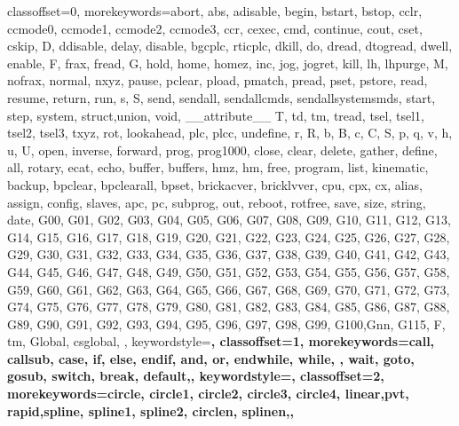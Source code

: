 {%
    classoffset=0,
    morekeywords={abort, abs, adisable, begin, bstart, bstop,%
    cclr, ccmode0, ccmode1, ccmode2, ccmode3, ccr,  cexec,%
    cmd, continue, cout, cset, cskip, D, ddisable,  delay,%
    disable, bgcplc, rticplc, dkill, do, dread, dtogread, dwell,%
    enable, F, frax, fread, G, hold, home, homez, inc, jog, jogret,%
    kill, lh, lhpurge, M, nofrax, normal, nxyz, pause, pclear, pload,%
    pmatch, pread, pset, pstore, read, resume, return, run, s, S, send,%
    sendall, sendallcmds, sendallsystemsmds, start, step, system, %
    struct,union, void, __attribute__%
    T, td, tm, tread, tsel, tsel1, tsel2, tsel3, txyz,%
    rot, lookahead, plc, plcc, undefine, r, R, b, B, c, C, S,%
    p, q, v, h, u, U, %
    open, inverse, forward, prog, prog1000, close, clear, delete, gather,%
    define, all, rotary, ecat, echo, buffer, buffers, hmz, hm, free,%
    program, list, kinematic, backup, bpclear, bpclearall, bpset, %
    brickacver, bricklvver, cpu, cpx, cx, alias, assign, config, slaves,%
    apc, pc, subprog, out, reboot, rotfree, save, size, string, date,%
    G00, G01, G02, G03, G04, G05, G06, G07, G08, G09,%
    G10, G11, G12, G13, G14, G15, G16, G17, G18, G19,%
    G20, G21, G22, G23, G24, G25, G26, G27, G28, G29,%
    G30, G31, G32, G33, G34, G35, G36, G37, G38, G39,%
    G40, G41, G42, G43, G44, G45, G46, G47, G48, G49,%
    G50, G51, G52, G53, G54, G55, G56, G57, G58, G59,%
    G60, G61, G62, G63, G64, G65, G66, G67, G68, G69,%
    G70, G71, G72, G73, G74, G75, G76, G77, G78, G79,%
    G80, G81, G82, G83, G84, G85, G86, G87, G88, G89,%
    G90, G91, G92, G93, G94, G95, G96, G97, G98, G99,%
    G100,Gnn, G115, F, tm, Global, csglobal,%
    },%
    keywordstyle=\ttfamily\normalfont\bfseries\color{key_word_1_color},%
    classoffset=1,%
    morekeywords={call, callsub, case, if, else, endif, and, or, endwhile, while,%
    , wait, goto, gosub, switch, break, default,},%
    keywordstyle=\ttfamily\normalfont\bfseries\color{key_word_2_color},%
    classoffset=2,%
    morekeywords={circle, circle1, circle2, circle3, circle4, linear,pvt,%
    rapid,spline, spline1, spline2, circlen, splinen,},%
}
